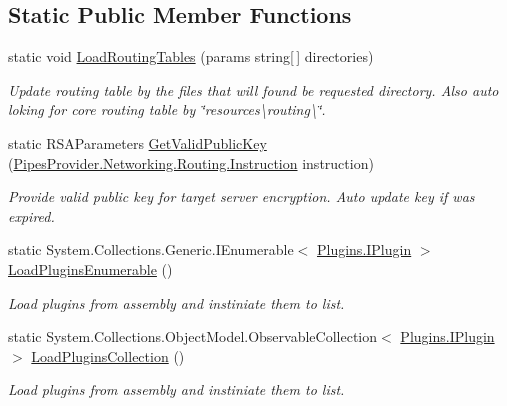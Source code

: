 \subsection*{Static Public Member Functions}
\begin{DoxyCompactItemize}
\item 
static void \mbox{\hyperlink{class_uniform_client_1_1_base_client_a5f8f22aa4ab8219fb5f1b6a358f68daf}{Load\+Routing\+Tables}} (params string\mbox{[}$\,$\mbox{]} directories)
\begin{DoxyCompactList}\small\item\em Update routing table by the files that will found be requested directory. Also auto loking for core routing table by \char`\"{}resources\textbackslash{}routing\textbackslash{}\char`\"{}. \end{DoxyCompactList}\item 
static R\+S\+A\+Parameters \mbox{\hyperlink{class_uniform_client_1_1_base_client_ad965aab32fccb9b6bcd9e6a576195f6f}{Get\+Valid\+Public\+Key}} (\mbox{\hyperlink{class_pipes_provider_1_1_networking_1_1_routing_1_1_instruction}{Pipes\+Provider.\+Networking.\+Routing.\+Instruction}} instruction)
\begin{DoxyCompactList}\small\item\em Provide valid public key for target server encryption. Auto update key if was expired. \end{DoxyCompactList}\item 
static System.\+Collections.\+Generic.\+I\+Enumerable$<$ \mbox{\hyperlink{interface_uniform_client_1_1_plugins_1_1_i_plugin}{Plugins.\+I\+Plugin}} $>$ \mbox{\hyperlink{class_uniform_client_1_1_base_client_aa60dbfa5bd8c46659aec7738193315f1}{Load\+Plugins\+Enumerable}} ()
\begin{DoxyCompactList}\small\item\em Load plugins from assembly and instiniate them to list. \end{DoxyCompactList}\item 
static System.\+Collections.\+Object\+Model.\+Observable\+Collection$<$ \mbox{\hyperlink{interface_uniform_client_1_1_plugins_1_1_i_plugin}{Plugins.\+I\+Plugin}} $>$ \mbox{\hyperlink{class_uniform_client_1_1_base_client_a99ae0bb1dd5bef374fcedb3f873bfe8b}{Load\+Plugins\+Collection}} ()
\begin{DoxyCompactList}\small\item\em Load plugins from assembly and instiniate them to list. \end{DoxyCompactList}\item 

\end{DoxyCompactItemize}
